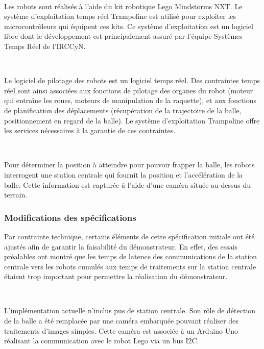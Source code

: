       ~
    
      Les robots sont réalisés à l'aide du kit robotique Lego Mindstorms NXT. Le
      système d'exploitation temps réel Trampoline est utilisé pour exploiter
      les microcontrôleurs qui équipent ces kits. Ce système d'exploitation est
      un logiciel libre dont le développement est principalement assuré par
      l'équipe Systèmes Temps Réel de l'IRCCyN.

      ~
    
      Le logiciel de pilotage des robots est un logiciel temps réel. Des
      contraintes temps réel sont ainsi associées aux fonctions de pilotage des
      organes du robot (moteur qui entraîne les roues, moteurs de manipulation
      de la raquette), et aux fonctions de planification des déplacements
      (récupération de la trajectoire de la balle, positionnement en regard de
      la balle). Le système d'exploitation Trampoline offre les services
      nécessaires à la garantie de ces contraintes.
  
      ~
    
      Pour déterminer la position à atteindre pour pouvoir frapper la balle, les
      robots interrogent une station centrale qui fournit la position et
      l'accélération de la balle. Cette information est capturée à l'aide d'une
      caméra située au-dessus du terrain.

      \subsubsection{Modifications des spécifications}

        Par contrainte technique, certains éléments de cette spécification
        initiale ont été ajustés afin de garantir la faisabilité du
        démonstrateur. En effet, des essais préalables ont montré que les temps
        de latence des communications de la station centrale vers les robots
        cumulés aux temps de traitements sur la station centrale étaient trop
        important pour permettre la réalisation du démonstrateur.

        ~
    
        L'implémentation actuelle n'inclus pus de station centrale. Son rôle de
        détection de la balle a été remplacée par une caméra embarquée pouvant
        réaliser des traitements d'images simples. Cette caméra est associée à
        un Arduino Uno réalisant la communication avec le robot Lego via un bus
        I2C.

